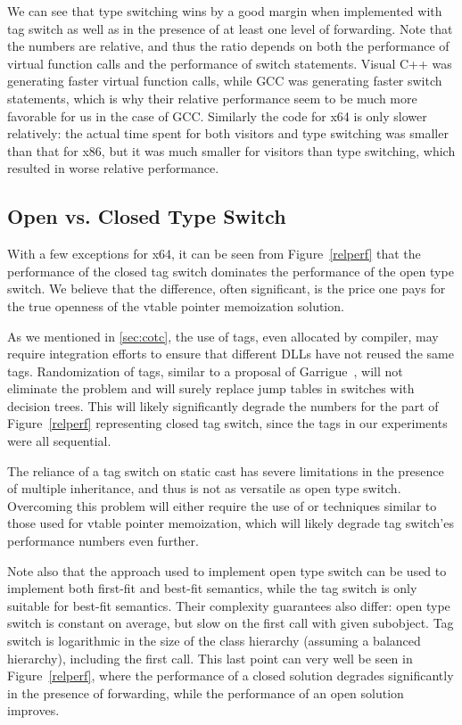 We can see that type switching wins by a good margin when implemented with tag switch as 
well as in the presence of at least one level of forwarding. Note that the 
numbers are relative, and thus the ratio depends on both the performance of 
virtual function calls and the performance of switch statements. Visual C++ was 
generating faster virtual function calls, while GCC was generating faster switch 
statements, which is why their relative performance seem to be much more 
favorable for us in the case of GCC.
Similarly the code for x64 is only slower relatively: the actual time spent for 
both visitors and type switching was smaller than that for x86, but it was much 
smaller for visitors than type switching, which resulted in worse relative 
performance.

\subsection{Open vs. Closed Type Switch}
\label{sec:cmp}

With a few exceptions for x64, it can be seen from Figure~\ref{relperf} 
that the performance of the closed tag switch dominates the performance of the 
open type switch. We believe that the difference, often significant, is the 
price one pays for the true openness of the vtable pointer memoization solution. 

As we mentioned in \textsection\ref{sec:cotc}, the use of tags, even allocated 
by compiler, may require integration efforts to ensure that different DLLs have 
not reused the same tags. Randomization of tags, similar to a proposal of 
Garrigue~\cite{garrigue-98}, will not eliminate the problem and will surely 
replace jump tables in switches with decision trees. This will likely 
significantly degrade the numbers for the part of Figure~\ref{relperf} 
representing closed tag switch, since the tags in our experiments were all 
sequential. 

The reliance of a tag switch on static cast has severe limitations in the 
presence of multiple inheritance, and thus is not as versatile as open type 
switch. Overcoming this problem will either require the use of 
 or techniques similar to those used for vtable pointer 
memoization, which will likely degrade tag switch'es performance numbers even 
further.

Note also that the approach used to implement open type switch can be used to 
implement both first-fit and best-fit semantics, while the tag switch is only suitable 
for best-fit semantics. Their complexity guarantees also differ: open type 
switch is constant on average, but slow on the first call with given subobject. 
Tag switch is logarithmic in the size of the class hierarchy 
(assuming a balanced hierarchy), including the first call. This last point can 
very well be seen in Figure~\ref{relperf}, where the performance of a closed solution
degrades significantly in the presence of forwarding, while the performance of an
open solution improves.

